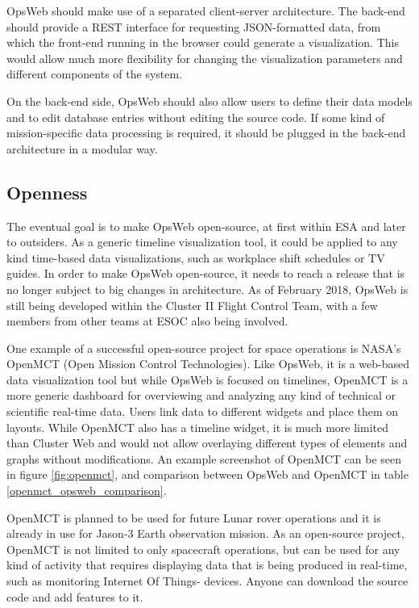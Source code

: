 OpsWeb should make use of a separated client-server architecture. The back-end should provide a REST interface for requesting JSON-formatted data, from which the front-end running in the browser could generate a visualization. This would allow much more flexibility for changing the visualization parameters and different components of the system.

On the back-end side, OpsWeb should also allow users to define their data models and to edit database entries without editing the source code. If some kind of mission-specific data processing is required, it should be plugged in the back-end architecture in a modular way.

\subsection{Openness}
The eventual goal is to make OpsWeb open-source, at first within ESA and later to outsiders. As a generic timeline visualization tool, it could be applied to any kind time-based data visualizations, such as workplace shift schedules or TV guides. In order to make OpsWeb open-source, it needs to reach a release that is no longer subject to big changes in architecture. As of February 2018, OpsWeb is still being developed within the Cluster II Flight Control Team, with a few members from other teams at ESOC also being involved. 

One example of a successful open-source project for space operations is NASA's OpenMCT (Open Mission Control Technologies). Like OpsWeb, it is a web-based data visualization tool but while OpsWeb is focused on timelines, OpenMCT is a more generic dashboard for overviewing and analyzing any kind of technical or scientific real-time data. Users link data to different widgets and place them on layouts. While OpenMCT also has a timeline widget, it is much more limited than Cluster Web and would not allow overlaying different types of elements and graphs without modifications. An example screenshot of OpenMCT can be seen in figure \ref{fig:openmct}, and comparison between OpsWeb and OpenMCT in table \ref{openmct_opsweb_comparison}.

OpenMCT is planned to be used for future Lunar rover operations and it is already in use for Jason-3 Earth observation mission. As an open-source project, OpenMCT is not limited to only spacecraft operations, but can be used for any kind of activity that requires displaying data that is being produced in real-time, such as monitoring Internet Of Things- devices. Anyone can download the source code and add features to it. \cite{trimble2014reconfigurable, trimble2016open}

